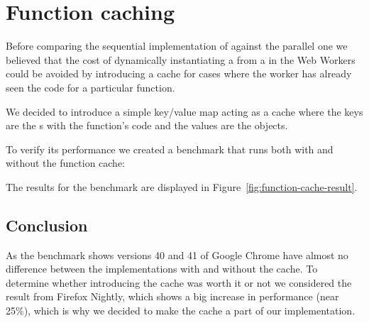 \section{Function caching}\label{sec:func-caching}

Before comparing the sequential implementation of  against the parallel one we believed that the cost of dynamically instantiating a \tfunction{} from a \tstring{} in the Web Workers could be avoided by introducing a cache for cases where the worker has already seen the code for a particular function.

We decided to introduce a simple key/value map acting as a cache where the keys are the \tstring{}s with the function's code and the values are the \tfunction{} objects.

To verify its performance we created a benchmark that runs both with and without the function cache:

The results for the benchmark are displayed in Figure~\ref{fig:function-cache-result}.

\subsection{Conclusion}
As the benchmark shows versions 40 and 41 of Google Chrome have almost no difference between the implementations with and without the cache. To determine whether introducing the cache was worth it or not we considered the result from Firefox Nightly, which shows a big increase in performance (near 25\%), which is why we decided to make the \tfunction{} cache a part of our implementation.

\pagebreak